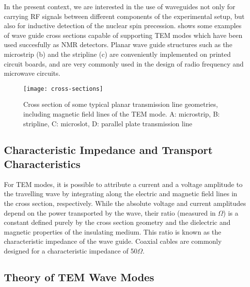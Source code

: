 In the present context, we are interested in the use of waveguides not only 
for carrying RF signals between different components of the experimental setup,
 but also for inductive detection of the nuclear  spin precession. 
shows some examples of wave guide cross sections capable of supporting
TEM modes which have been used succesfully as NMR detectors. 
Planar wave guide structures such as the microstrip (b) and the
stripline (c) are conveniently implemented on printed circuit
boards, \cite{Barret:1955ie} and are very commonly used in the design of
radio frequency and microwave circuits. 


\begin{figure}
	\begin{center}
		\texttt{[image: cross-sections]}
	\end{center}
	\caption{Cross section of some typical planar transmission line geometries,
  		including magnetic field lines of the TEM mode. A: microstrip, B: stripline, C: microslot, D: parallel plate transmission line}
	\label{fig:cross-sections}
\end{figure}

\subsection{Characteristic Impedance and Transport
Characteristics}\label{characteristic-impedance-and-transport-characteristics}

For TEM modes, it is possible to attribute a current and a voltage
amplitude to the travelling wave by integrating along the electric and
magnetic field lines in the cross section, respectively.
 While the absolute voltage and current amplitudes depend on the 
power transported by the wave, their
ratio (measured in $\Omega$) is a constant defined purely by the cross section
geometry and the dielectric and magnetic properties of the insulating
medium. This ratio is known as the characteristic impedance  of
the wave guide. Coaxial cables are commonly designed for a
characteristic impedance of 50$\Omega$.

\subsection{Theory of TEM Wave Modes}\label{theory-of-tem-wave-modes}

